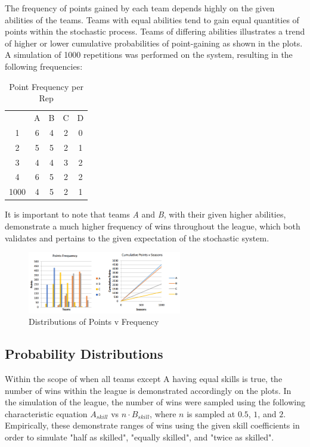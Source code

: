 \documentclass[12pt]{article}
\begin{document}
The frequency of points gained by each team depends highly on the given abilities of the teams. Teams with equal abilities tend to gain equal quantities of points within the stochastic process. Teams of differing abilities illustrates a trend of higher or lower cumulative probabilities of point-gaining as shown in the plots. A simulation of 1000 repetitions was performed on the system, resulting in the following frequencies:

\begin{table}[h]
\centering
\begin{tabular}{ccccc}
     & A & B & C & D \\
1    & 6 & 4 & 2 & 0 \\
2    & 5 & 5 & 2 & 1 \\
3    & 4 & 4 & 3 & 2 \\
4    & 6 & 5 & 2 & 2 \\
1000 & 4 & 5 & 2 & 1
\end{tabular}
\caption{Point Frequency per Rep}
\end{table}

It is important to note that teams \emph{A} and \emph{B}, with their given higher abilities, demonstrate a much higher frequency of wins throughout the league, which both validates and pertains to the given expectation of the stochastic system.\cite{applebaum}

\begin{figure}[h]
\centering
\includegraphics[width=0.6\textwidth]{q1ii_graphs.png}
\caption{Distributions of Points v Frequency}
\end{figure}

\subsection{Probability Distributions}
Within the scope of when all teams except A having equal skills is true, the number of wins within the league is demonstrated accordingly on the plots. In the simulation of the league, the number of wins were sampled using the following characteristic equation $A_{skill}$ vs $n \cdot B_{skill}$, where $n$ is sampled at $0.5$, $1$, and $2$. Empirically, these demonstrate ranges of wins using the given skill coefficients in order to simulate "half as skilled", "equally skilled", and "twice as skilled".
\end{document}
